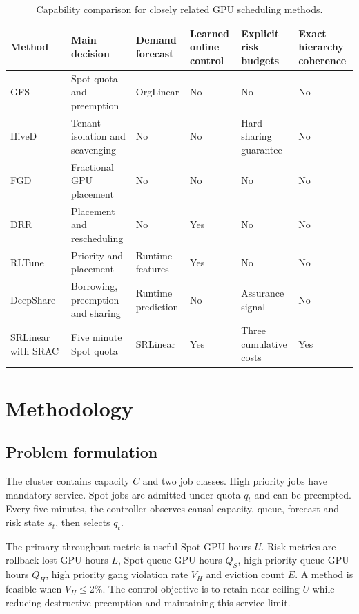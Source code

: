 \documentclass[conference]{IEEEtran}
\begin{document}
\begin{table}[t]
\centering
\caption{Capability comparison for closely related GPU scheduling methods.}
\label{tab:gap}
\scriptsize
\setlength{\tabcolsep}{4.5pt}
\begin{tabular}{llllll}
\toprule
Method & Main decision & Demand forecast & Learned online control & Explicit risk budgets & Exact hierarchy coherence \\
\midrule
GFS~\cite{gfs} & Spot quota and preemption & OrgLinear & No & No & No \\
HiveD~\cite{hived} & Tenant isolation and scavenging & No & No & Hard sharing guarantee & No \\
FGD~\cite{fgd} & Fractional GPU placement & No & No & No & No \\
DRR~\cite{drr} & Placement and rescheduling & No & Yes & No & No \\
RLTune~\cite{rltune} & Priority and placement & Runtime features & Yes & No & No \\
DeepShare~\cite{deepshare} & Borrowing, preemption and sharing & Runtime prediction & No & Assurance signal & No \\
SRLinear with SRAC & Five minute Spot quota & SRLinear & Yes & Three cumulative costs & Yes \\
\bottomrule
\end{tabular}
\end{table}

\section{Methodology}
\subsection{Problem formulation}
The cluster contains capacity $C$ and two job classes. High priority jobs have mandatory service. Spot jobs are admitted under quota $q_t$ and can be preempted. Every five minutes, the controller observes causal capacity, queue, forecast and risk state $s_t$, then selects $q_t$.

The primary throughput metric is useful Spot GPU hours $U$. Risk metrics are rollback lost GPU hours $L$, Spot queue GPU hours $Q_S$, high priority queue GPU hours $Q_H$, high priority gang violation rate $V_H$ and eviction count $E$. A method is feasible when $V_H \leq 2\%$. The control objective is to retain near ceiling $U$ while reducing destructive preemption and maintaining this service limit.
\end{document}
